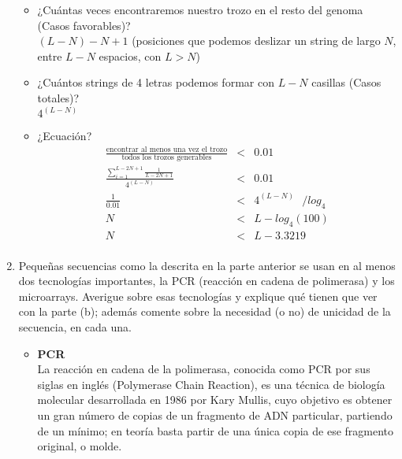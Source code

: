 \begin{enumerate}
		\begin{itemize}
			\item ¿Cuántas veces encontraremos nuestro trozo en el
				resto del genoma (Casos favorables)?\\

				$(L - N) - N + 1$
				(posiciones que podemos deslizar un string de largo $N$,
				entre $L - N$ espacios, con $L > N$)

			\item ¿Cuántos strings de 4 letras podemos formar con $L - N$
				casillas (Casos totales)?\\

				$4^{(L-N)}$

			\item ¿Ecuación?\\

				\begin{eqnarray}
					\frac{\text{encontrar al menos una vez el trozo}}{\text{todos los trozos generables}} &<& 0.01\\
					\frac{\sum_{i=1}^{L- 2N + 1} \frac{1}{L - 2N + 1}}{4^{(L-N)}} &<& 0.01\\
					\frac{1}{0.01} &<& 4^{(L-N)} \ \ \ / log_{4}\\
					N &<& L - log_{4}(100)\\
					N &<& L - 3.3219\\
				\end{eqnarray}

\end{itemize}

\item Pequeñas secuencias como la descrita en la parte anterior
	se usan en al menos dos tecnologías importantes, la PCR
	(reacción en cadena de polimerasa) y los microarrays.
	Averigue sobre esas tecnologías y explique qué tienen que
	ver con la parte (b); además comente sobre la necesidad (o no)
	de unicidad de la secuencia, en cada una.

	\begin{itemize}
		\item \textbf{PCR} \\

			La reacción en cadena de la polimerasa, conocida como
			PCR por sus siglas en inglés (Polymerase Chain Reaction),
			es una técnica de biología molecular desarrollada en 
			1986 por Kary Mullis, cuyo objetivo es obtener un gran
			número de copias de un fragmento de ADN particular,
			partiendo de un mínimo; en teoría basta partir de 
			una única copia de ese fragmento original, o molde.
			

\end{itemize}
\end{enumerate}
